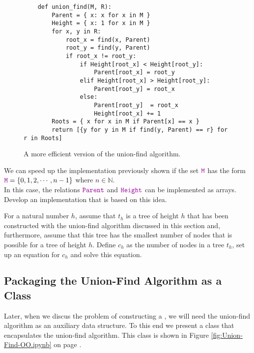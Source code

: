 \begin{figure}[!ht]
\centering
\begin{verbatim}
    def union_find(M, R):
        Parent = { x: x for x in M } 
        Height = { x: 1 for x in M }
        for x, y in R:
            root_x = find(x, Parent)
            root_y = find(y, Parent)
            if root_x != root_y:
                if Height[root_x] < Height[root_y]:
                    Parent[root_x] = root_y
                elif Height[root_x] > Height[root_y]:
                    Parent[root_y] = root_x
                else:
                    Parent[root_y]  = root_x
                    Height[root_x] += 1
        Roots = { x for x in M if Parent[x] == x }
        return [{y for y in M if find(y, Parent) == r} for r in Roots]
\end{verbatim}
\vspace*{-0.3cm}
\caption{A more efficient version of the union-find algorithm.}
\label{fig:Union-Find.ipynb}
\end{figure}

\exercise
We can speed up the implementation previously shown if the set $\mytt{M}$ has the form
\\[0.2cm]
\hspace*{1.3cm}
$\mytt{M} = \{ 0, 1, 2, \cdots, n-1 \}$ \quad where $n \in \mathbb{N}$.
\\[0.2cm]
In this case, the relations $\mytt{Parent}$ and $\mytt{Height}$ can be implemented as arrays.
Develop an implementation that is based on this idea.
\eox

\exercise
For a natural number $h$, assume that $t_h$ is a tree of height $h$ that has been constructed with the union-find algorithm
discussed in this section and, furthermore, assume that this tree has the smallest number of nodes that is
possible for a tree of height $h$.  Define $c_h$ as the number of nodes in a tree $t_h$, set up an equation for
$c_h$ and solve this equation. \eox


\subsection{Packaging the  Union-Find Algorithm as a Class \label{sec:union-find-oo}}
Later, when we discus the problem of constructing a , we will need the union-find algorithm as an
auxiliary data structure.  To this end we present a class that encapsulates the union-find
algorithm.  This class is shown in Figure \ref{fig:Union-Find-OO.ipynb} on page
\pageref{fig:Union-Find-OO.ipynb}.

